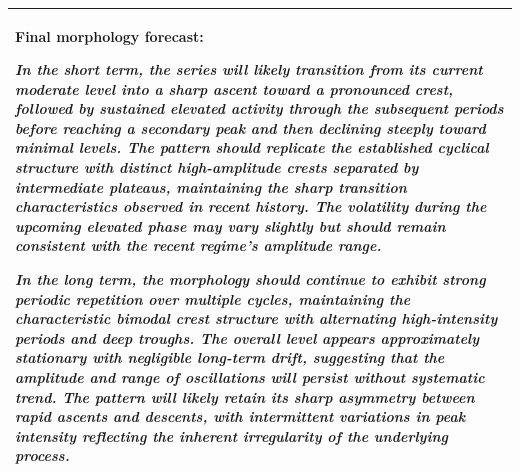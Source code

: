 \documentclass[11pt]{article}
\begin{document}
\begin{table}[t]
\begin{tabular}{p{}}
\hdashline

\colorbox{gray!10}{\parbox{0.95\textwidth}{%
\textbf{Final morphology forecast:}

\textit{In the short term, the series will likely transition from its current
moderate level into a sharp ascent toward a pronounced crest, followed by
sustained elevated activity through the subsequent periods before reaching a
secondary peak and then declining steeply toward minimal levels. The pattern
should replicate the established cyclical structure with distinct high-amplitude
crests separated by intermediate plateaus, maintaining the sharp transition
characteristics observed in recent history. The volatility during the upcoming
elevated phase may vary slightly but should remain consistent with the recent
regime's amplitude range.}

\textit{In the long term, the morphology should continue to exhibit strong
periodic repetition over multiple cycles, maintaining the characteristic
bimodal crest structure with alternating high-intensity periods and deep
troughs. The overall level appears approximately stationary with negligible
long-term drift, suggesting that the amplitude and range of oscillations will
persist without systematic trend. The pattern will likely retain its sharp
asymmetry between rapid ascents and descents, with intermittent variations in
peak intensity reflecting the inherent irregularity of the underlying process.}
}} \\

\bottomrule
\end{tabular}
\end{table}
\end{document}
